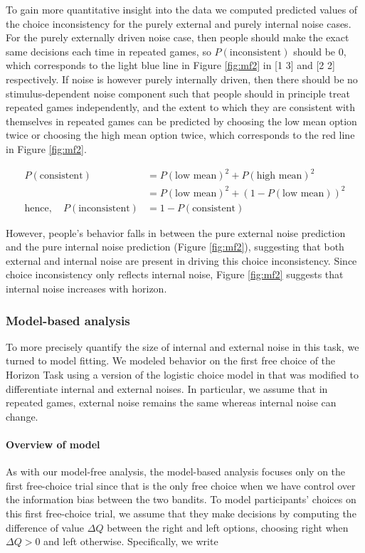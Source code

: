 \documentclass[12pt]{article}
\begin{document}
	To gain more quantitative insight into the data we computed predicted values of the choice inconsistency for the purely external and purely internal noise cases.  For the purely externally driven noise case, then people should make the exact same decisions each time in repeated games, so $P(\mbox{inconsistent})$ should be 0, which corresponds to the light blue line in Figure \ref{fig:mf2} in [1 3] and [2 2] respectively. If noise is however purely internally driven, then there should be no stimulus-dependent noise component such that people should in principle treat repeated games independently, and the extent to which they are consistent with themselves in repeated games can be predicted by choosing the low mean option twice or choosing the high mean option twice, which corresponds to the red line in Figure \ref{fig:mf2}.
	
	\begin{equation*}
	\begin{split}
	P(\mbox{consistent}) &= P(\mbox{low mean})^2 + P(\mbox{high mean})^2\\
	&= P(\mbox{low mean})^2 + (1-P(\mbox{low mean}))^2\\ \mbox{hence},\quad P(\mbox{inconsistent}) &= 1 - P(\mbox{consistent})
	\end{split}
	\end{equation*}
	
	However, people's behavior falls in between the pure external noise prediction and the pure internal noise prediction (Figure \ref{fig:mf2}), suggesting that both external and internal noise are present in driving this choice inconsistency. Since choice inconsistency only reflects internal noise, Figure \ref{fig:mf2} suggests that internal noise increases with horizon.
	
	\subsubsection*{Model-based analysis}
	To more precisely quantify the size of internal and external noise in this task, we turned to model fitting. We modeled behavior on the first free choice of the Horizon Task using a version of the logistic choice model in \citep{wilson2014} that was modified to differentiate internal and external noises. In particular, we assume that in repeated games, external noise remains the same whereas internal noise can change. 
	
	\paragraph{Overview of model}
	As with our model-free analysis, the model-based analysis focuses only on the first free-choice trial since that is the only free choice when we have control over the information bias between the two bandits. To model participants’ choices on this first free-choice trial, we assume that they make decisions by computing the difference of value $\Delta Q$ between the right and left options, choosing right when $\Delta Q > 0$ and left otherwise.  Specifically, we write
	
\end{document}
